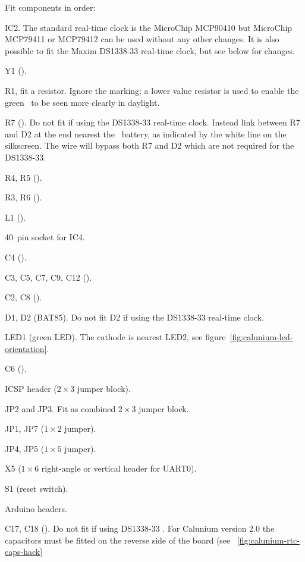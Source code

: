 Fit components in order:
\begin{buildorder}
\item IC2. The standard real-time clock is the MicroChip MCP90410 but
  MicroChip MCP79411 or MCP79412 can be used without any other
  changes.
  It is also possible to fit the Maxim DS1338-33 real-time clock,
  but see below for changes.
\item Y1 ().
\item R1, fit a  resistor. Ignore the  marking; a
  lower value resistor is used to enable the green \led\ to be seen
  more clearly in daylight.
\item R7 (). Do not fit if using the DS1338-33 real-time
  clock. Instead link between R7 and D2 at the end nearest the \rtc\
  battery, as indicated by the white line on the silkscreen. The wire
  will bypass both R7 and D2 which are not required for the DS1338-33.
\item R4, R5 (\kohm{4.7}).
\item R3, R6 ().
\item L1 ().
\item 40~pin socket for IC4.
\item C4 ().
\item C3, C5, C7, C9, C12 ().
\item C2, C8 ().
\item D1, D2 (BAT85). Do not fit D2 if using the DS1338-33 real-time clock.
\item LED1 (green LED). The cathode is nearest LED2, see
  figure~\ref{fig:calunium-led-orientation}.
\item C6 ().
\item ICSP header ($2 \times 3$ jumper block). %
\item JP2 and JP3. Fit as combined $2 \times 3$ jumper block.
\item JP1, JP7 ($1 \times 2$ jumper).
\item JP4, JP5 ($1 \times 5$ jumper).
\item X5 ($1 \times 6$ right-angle or vertical header for UART0).
\item S1 (reset switch).
\item Arduino headers. 
\item C17, C18 (). Do not fit if using DS1338-33 \rtc. For
  Calunium version 2.0 the capacitors must be fitted on the reverse
  side of the board (see \figurename~\ref{fig:calunium-rtc-caps-hack}

\end{buildorder}
